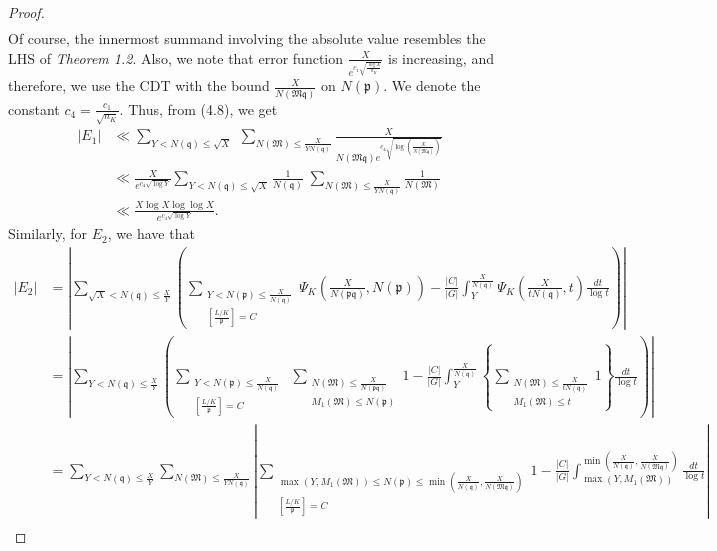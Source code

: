 \documentclass[10pt,a4paper]{amsart}
\begin{document}
\begin{proof}
\begin{align}
\end{align}
Of course, the innermost summand involving the absolute value resembles the LHS of \textit{Theorem 1.2}. Also, we note that error function $\frac{X}{e^{c_1\sqrt{\frac{\log X}{n_K}}}}$ is increasing, and therefore, we use the CDT with the bound $\frac{X}{N(\mathfrak{Mq})}$ on $N(\mathfrak{p})$. We denote the constant $c_4 = \frac{c_1}{\sqrt{n_K}}$. Thus, from (4.8), we get
\begin{align}
     |E_1| &\ll \sum_{Y<N(\mathfrak{q})\leq \sqrt{X}} \;\sum_{N(\mathfrak{M}) \leq \frac{X}{YN(\mathfrak{q})}} \frac{X}{N(\mathfrak{Mq})e^{c_4\sqrt{\log \left(\frac{X}{N(\mathfrak{Mq})}\right)}}} \nonumber \\
    &\ll \frac{X}{e^{c_4\sqrt{\log Y}}}\sum_{Y<N(\mathfrak{q})\leq \sqrt{X}}\frac{1}{N(\mathfrak{q})} \;\sum_{N(\mathfrak{M}) \leq \frac{X}{YN(\mathfrak{q})}}\frac{1}{N(\mathfrak{M})} \nonumber \\ 
    &\ll \frac{X\log X\log\log X}{e^{c_4\sqrt{\log Y}}}.
\end{align}
Similarly, for $E_2$, we have that
\begin{align}
    |E_2| &= \left| \sum_{\sqrt{X}<N(\mathfrak{q})\leq\frac{X}{Y}}\left(\sum_{\substack{Y<N(\mathfrak{p})\leq \frac{X}{N(\mathfrak{q})} \\ \left[\frac{L/K}{\mathfrak{p}}\right] =C}} \Psi_K\left(\frac{X}{N(\mathfrak{p}\mathfrak{q})},N(\mathfrak{p})\right) - \frac{|C|}{|G|}\int_Y^{\frac{X}{N(\mathfrak{q})}} \Psi_K\left(\frac{X}{tN(\mathfrak{q})},t\right)\frac{dt}{\log t}\right)\right|  \nonumber \\
    &= \left| \sum_{Y<N(\mathfrak{q})\leq \frac{X}{Y}}\left(\sum_{\substack{Y<N(\mathfrak{p})\leq \frac{X}{N(\mathfrak{q})} \\ \left[\frac{L/K}{\mathfrak{p}}\right] =C}}\; \sum_{\substack{N(\mathfrak{M}) \leq \frac{X}{N(\mathfrak{pq})} \\ M_1(\mathfrak{M})\leq N(\mathfrak{p})}} 1- \frac{|C|}{|G|}\int_Y^{\frac{X}{N(\mathfrak{q})}} \left\{\sum_{\substack{N(\mathfrak{M}) \leq \frac{X}{tN(\mathfrak{q})} \\ M_1(\mathfrak{M})\leq t}}1\right\}\frac{dt}{\log t}\right)\right| \nonumber \\
    &= \sum_{Y<N(\mathfrak{q})\leq \frac{X}{Y}} \sum_{N(\mathfrak{M}) \leq \frac{X}{YN(\mathfrak{q})}}\left|           \sum_{\substack{\max(Y,M_1(\mathfrak{M}))\leq N(\mathfrak{p})\leq  \min\left(\frac{X}{N(\mathfrak{q})},\frac{X}{N(\mathfrak{Mq})}\right) \\  \left[\frac{L/K}{\mathfrak{p}}\right] =C            }       }      1    - \frac{|C|}{|G|}\int_{\max(Y,M_1(\mathfrak{M}))}^{\min\left(\frac{X}{N(\mathfrak{q})},\frac{X}{N(\mathfrak{Mq})}\right)}\frac{dt}{\log t}          \right| \nonumber \\

\end{align}
\end{proof}
\end{document}
